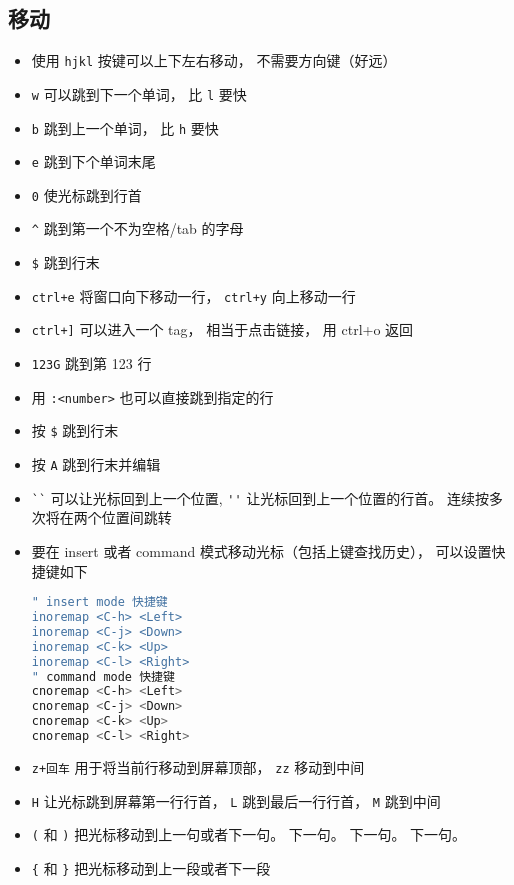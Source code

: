 \subsection{移动}
\begin{itemize}
\item 使用 \verb`hjkl` 按键可以上下左右移动， 不需要方向键（好远）
\item \verb`w` 可以跳到下一个单词， 比 \verb`l` 要快
\item \verb`b` 跳到上一个单词， 比 \verb`h` 要快
\item \verb`e` 跳到下个单词末尾
\item \verb`0` 使光标跳到行首
\item \verb`^` 跳到第一个不为空格/tab 的字母
\item \verb`$` 跳到行末
\item \verb`ctrl+e` 将窗口向下移动一行， \verb`ctrl+y` 向上移动一行
\item \verb`ctrl+]` 可以进入一个 tag， 相当于点击链接， 用 ctrl+o 返回
\item \verb`123G` 跳到第 123 行
\item 用 \verb`:<number>` 也可以直接跳到指定的行
\item 按 \verb`$` 跳到行末
\item 按 \verb`A` 跳到行末并编辑
\item \verb|``| 可以让光标回到上一个位置, \verb`''` 让光标回到上一个位置的行首。 连续按多次将在两个位置间跳转
\item 要在 insert 或者 command 模式移动光标（包括上键查找历史）， 可以设置快捷键如下
\begin{lstlisting}[language=bash]
" insert mode 快捷键
inoremap <C-h> <Left>
inoremap <C-j> <Down>
inoremap <C-k> <Up>
inoremap <C-l> <Right>
" command mode 快捷键
cnoremap <C-h> <Left>
cnoremap <C-j> <Down>
cnoremap <C-k> <Up>
cnoremap <C-l> <Right>
\end{lstlisting}
\item \verb`z+回车` 用于将当前行移动到屏幕顶部， \verb`zz` 移动到中间
\item \verb`H` 让光标跳到屏幕第一行行首， \verb`L` 跳到最后一行行首， \verb`M` 跳到中间
\item \verb`(` 和 \verb`)` 把光标移动到上一句或者下一句。 下一句。 下一句。 下一句。
\item \verb`{` 和 \verb`}` 把光标移动到上一段或者下一段
\end{itemize}

